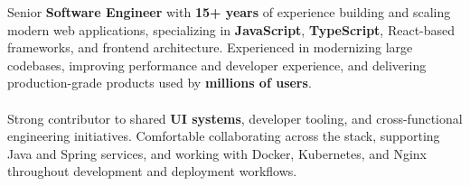 
\begin{minipage}[t]{0.5\textwidth}
    \vspace{-6pt}

    Senior \textbf{Software Engineer} with \textbf{15+ years} of experience building and scaling modern web applications, specializing in \textbf{JavaScript}, \textbf{TypeScript}, React-based frameworks, and frontend architecture. Experienced in modernizing large codebases, improving performance and developer experience, and delivering production-grade products used by \textbf{millions of users}.
    \\
    \\
    Strong contributor to shared \textbf{UI systems}, developer tooling, and cross-functional engineering initiatives. Comfortable collaborating across the stack, supporting Java and Spring services, and working with Docker, Kubernetes, and Nginx throughout development and deployment workflows.

\end{minipage}
\hfill %
